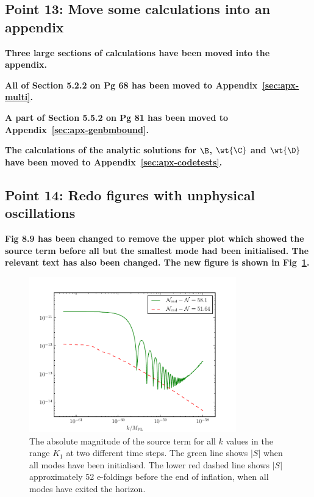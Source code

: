 %  


\subsection{Point 13: Move some calculations into an appendix}
\textbf{Three large sections of calculations have been moved into the appendix.}

\textbf{All of Section 5.2.2 on Pg 68 has been moved to Appendix~\ref{sec:apx-multi}.}

\textbf{A part of Section 5.5.2 on Pg 81 has been moved to Appendix~\ref{sec:apx-genbmbound}.}

\textbf{The calculations of the analytic solutions for $\B$, $\wt{\C}$ and $\wt{\D}$ have been
moved to Appendix~\ref{sec:apx-codetests}.}

\subsection{Point 14: Redo figures with unphysical oscillations}
\textbf{Fig 8.9 has been changed to remove the upper plot which showed the source term before all
but the smallest mode had been initialised. The relevant text has also been changed. The new figure
is shown in Fig~\ref{fig:src-3ns-2}.}

\begin{figure}[htbp]
\centering
\includegraphics[width=0.8\textwidth]{numerical/graphs/src_3ns-large}
\caption[Source Term at Two Different Times]{The absolute magnitude of the source 
term for all $k$ values in the range $K_1$ at two different time steps. The green line shows
$|S|$ when all modes have been initialised. The lower red dashed line shows $|S|$ approximately 
52 e-foldings before the end of inflation, when all modes have
exited the horizon.}
\label{fig:src-3ns-2}
\end{figure}

